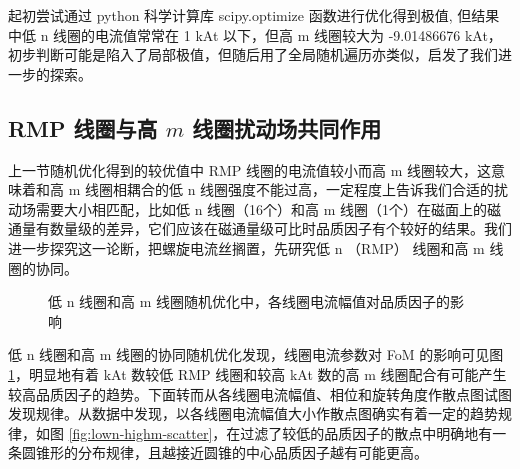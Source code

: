   
  起初尝试通过 python 科学计算库 scipy.optimize 函数进行优化得到极值, 但结果中低 n 线圈的电流值常常在 1 kAt 以下，但高 m 线圈较大为 -9.01486676 kAt，初步判断可能是陷入了局部极值，但随后用了全局随机遍历亦类似，启发了我们进一步的探索。
  

  
  




\subsection{RMP 线圈与高 $m$ 线圈扰动场共同作用}
上一节随机优化得到的较优值中 RMP 线圈的电流值较小而高 m 线圈较大，这意味着和高 m 线圈相耦合的低 n 线圈强度不能过高，一定程度上告诉我们合适的扰动场需要大小相匹配，比如低 n 线圈（16个）和高 m 线圈（1个）在磁面上的磁通量有数量级的差异，它们应该在磁通量级可比时品质因子有个较好的结果。我们进一步探究这一论断，把螺旋电流丝搁置，先研究低 n （RMP） 线圈和高 m 线圈的协同。

  
  
\begin{figure}[t]
  \centering
  \label{fig:kAt-FoM}
  \caption{低 n 线圈和高 m 线圈随机优化中，各线圈电流幅值对品质因子的影响}
  \end{figure}
  
低 n 线圈和高 m 线圈的协同随机优化发现，线圈电流参数对 FoM 的影响可见图 \ref{fig:kAt-FoM}，明显地有着 kAt 数较低 RMP 线圈和较高 kAt 数的高 m 线圈配合有可能产生较高品质因子的趋势。下面转而从各线圈电流幅值、相位和旋转角度作散点图试图发现规律。从数据中发现，以各线圈电流幅值大小作散点图确实有着一定的趋势规律，如图 \ref{fig:lown-highm-scatter}，在过滤了较低的品质因子的散点中明确地有一条圆锥形的分布规律，且越接近圆锥的中心品质因子越有可能更高。

